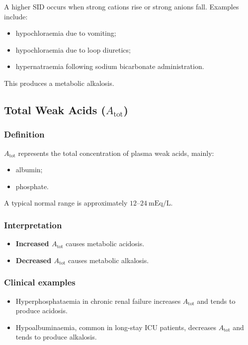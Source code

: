 \documentclass[11pt,a4paper]{article}
\begin{document}
A higher SID occurs when strong cations rise or strong anions fall. Examples include:
\begin{itemize}
    \item hypochloraemia due to vomiting;
    \item hypochloraemia due to loop diuretics;
    \item hypernatraemia following sodium bicarbonate administration.
\end{itemize}

This produces a metabolic alkalosis.

\subsection{Total Weak Acids (\(A_{\mathrm{tot}}\))}

\subsubsection{Definition}

\(A_{\mathrm{tot}}\) represents the total concentration of plasma weak acids, mainly:
\begin{itemize}
    \item albumin;
    \item phosphate.
\end{itemize}

A typical normal range is approximately \(12\text{--}24~\mathrm{mEq/L}\).

\subsubsection{Interpretation}

\begin{itemize}
    \item \textbf{Increased \(A_{\mathrm{tot}}\)} causes metabolic acidosis.
    \item \textbf{Decreased \(A_{\mathrm{tot}}\)} causes metabolic alkalosis.
\end{itemize}

\subsubsection{Clinical examples}

\begin{itemize}
    \item Hyperphosphataemia in chronic renal failure increases \(A_{\mathrm{tot}}\) and tends to produce acidosis.
    \item Hypoalbuminaemia, common in long-stay ICU patients, decreases \(A_{\mathrm{tot}}\) and tends to produce alkalosis.
\end{itemize}
\end{document}

